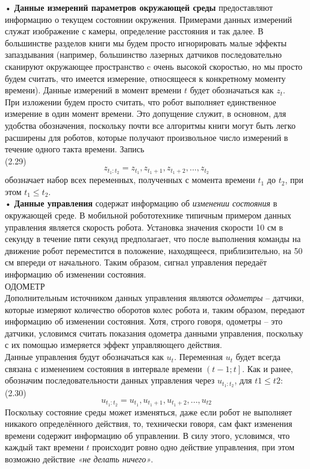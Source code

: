 \documentclass[10pt,a4paper]{article}
\begin{document}
 • \textbf{Данные измерений параметров окружающей среды} предоставляют информацию о текущем состоянии окружения. Примерами данных измерений служат изображение с камеры, определение расстояния и так далее. В большинстве разделов книги мы будем просто игнорировать малые эффекты запаздывания (например, большинство лазерных датчиков последовательно сканируют окружающее пространство c очень высокой скоростью, но мы просто будем считать, что имеется измерение, относящееся к конкретному моменту времени). Данные измерений в момент времени $t$ будет обозначаться как $z_t$.\\ 
 При изложении будем просто считать, что робот выполняет единственное измерение в один момент времени. Это допущение служит, в основном, для удобства обозначения, поскольку почти все алгоритмы книги могут быть легко расширены для роботов, которые получают произвольное число измерений в течение одного такта времени. Запись\\  

 (2.29)$$z_{t_1:t_2}=z_{t_1},z_{t_1+1},z_{t_1+2},...,z_{t_2}$$ 
 обозначает набор всех переменных, полученных с момента времени $t_1$ до $t_2$, при этом $t_1\leq t_2$.\\
 
 • \textbf{Данные управления} содержат информацию об \textit{изменении состояния} в окружающей среде. В мобильной робототехнике типичным примером данных управления является скорость робота. Установка значения скорости 10 см в секунду в течение пяти секунд предполагает, что после выполнения команды на движение робот переместится в положение, находящееся, приблизительно, на 50 см впереди от начального. Таким образом, сигнал управления передаёт информацию об изменении состояния.\\
 ОДОМЕТР\\
 Дополнительным источником данных управления являются \textit{одометры} – датчики, которые измеряют количество оборотов колес робота и, таким образом, передают информацию об изменении состояния. Хотя, строго говоря, одометры – это датчики, условимся считать показания одометра данными управления, поскольку с их помощью измеряется эффект управляющего действия.\\
 Данные управления будут обозначаться как $u_t$. Переменная $u_t$ будет всегда связана с изменением состояния в интервале времени $\left( t-1;t\right] $. Как и ранее, обозначим последовательности данных управления через $u_{t_1:t_2}$, для $t1\leq t2$:\\

 (2.30) $$u_{t_1:t_2} = u_{t_1},u_{t_1+1},u_{t_1+2}, . . . , u_{t2}$$
 Поскольку состояние среды может изменяться, даже если робот не выполняет никакого определённого действия, то, технически говоря, сам факт изменения времени содержит информацию об управлении. В силу этого, условимся, что каждый такт времени $t$ происходит ровно одно действие управления, при этом возможно действие \textit{«не делать ничего»}.\\ 
 
\end{document}
